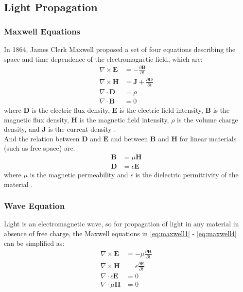 \subsection{Light Propagation}
\subsubsection{Maxwell Equations}
In 1864, James Clerk Maxwell proposed a set of four equations describing the space and time dependence of the electromagnetic field, which are:
\begin{align}
  \nabla \times \textbf{E} & = -\frac{\partial \textbf{B}}{\partial t}             \label{eq:maxwell1} \\
  \nabla \times \textbf{H} & = \textbf{J} + \frac{\partial \textbf{D}}{\partial t} \label{eq:maxwell2} \\
  \nabla \cdot \textbf{D}  & = \rho                                                \label{eq:maxwell3} \\
  \nabla \cdot \textbf{B}  & = 0 \label{eq:maxwell4}
\end{align}
where $\textbf{D}$ is the electric flux density, $\textbf{E}$ is the electric field intensity, $\textbf{B}$ is the magnetic flux density, $\textbf{H}$ is the magnetic field intensity, $\rho$ is the volume charge density, and $\textbf{J}$ is the current density \cite{Daintith2009}.\\
And the relation between $\textbf{D}$ and $\textbf{E}$ and between $\textbf{B}$ and $\textbf{H}$ for linear materials (such as free space) are:
\begin{align}
  \textbf{B} & = \mu \textbf{H}      \\
  \textbf{D} & = \epsilon \textbf{E}
\end{align}
where $\mu$ is the magnetic permeability and $\epsilon$ is the dielectric permittivity of the material \cite{Wilkinson2017}.\\

\subsubsection{Wave Equation}
Light is an electromagnetic wave, so for propagation of light in any material in absence of free charge, the Maxwell equations in \cref{eq:maxwell1} - \cref{eq:maxwell4} can be simplified as:
\begin{align}
  \nabla \times \textbf{E}         & = -\mu \frac{\partial \textbf{H}}{\partial t}     \label{eq:simplified_maxwell1} \\
  \nabla \times \textbf{H}         & = \epsilon \frac{\partial \textbf{E}}{\partial t} \label{eq:simplified_maxwell2} \\
  \nabla \cdot \epsilon \textbf{E} & = 0                                               \label{eq:simplified_maxwell3} \\
  \nabla \cdot \mu \textbf{H}      & = 0 \label{eq:simplified_maxwell4}
\end{align}

